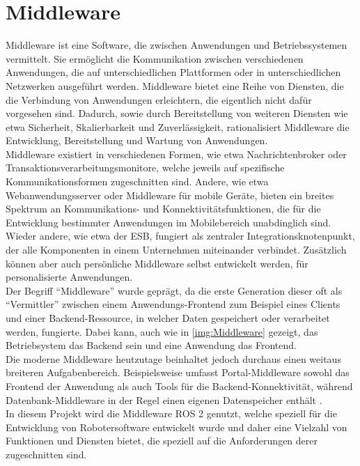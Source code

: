 \section{Middleware}\label{sec:Middleware}
Middleware ist eine Software, die zwischen Anwendungen und Betriebssystemen vermittelt. Sie ermöglicht die Kommunikation zwischen verschiedenen Anwendungen, die auf unterschiedlichen Plattformen oder in unterschiedlichen Netzwerken ausgeführt werden. Middleware bietet eine Reihe von Diensten, die die Verbindung von Anwendungen erleichtern, die eigentlich nicht dafür vorgesehen sind. Dadurch, sowie durch Bereitstellung von weiteren Diensten wie etwa Sicherheit, Skalierbarkeit und Zuverlässigkeit, rationalisiert Middleware die Entwicklung, Bereitstellung und Wartung von Anwendungen.
\\

\noindent
Middleware existiert in verschiedenen Formen, wie etwa Nachrichtenbroker oder Transaktionsverarbeitungsmonitore, welche jeweils auf spezifische Kommunikationsformen zugeschnitten sind. Andere, wie etwa Webanwendungsserver oder Middleware für mobile Geräte, bieten ein breites Spektrum an Kommunikations- und Konnektivitätsfunktionen, die für die Entwicklung bestimmter Anwendungen im Mobilebereich unabdinglich sind. Wieder andere, wie etwa der \ac{ESB}, fungiert als zentraler Integrationsknotenpunkt, der alle Komponenten in einem Unternehmen miteinander verbindet. Zusätzlich können aber auch persönliche Middleware selbst entwickelt werden, für personalisierte Anwendungen.
\\

\noindent
Der Begriff ``Middleware'' wurde geprägt, da die erste Generation dieser oft als ``Vermittler'' zwischen einem Anwendungs-Frontend zum Beispiel eines Clients und einer Backend-Ressource, in welcher Daten gespeichert oder verarbeitet werden, fungierte. Dabei kann, auch wie in \autoref{img:Middleware} gezeigt, das Betriebsystem das Backend sein und eine Anwendung das Frontend.\\
Die moderne Middleware heutzutage beinhaltet jedoch durchaus einen weitaus breiteren Aufgabenbereich. Beispielsweise umfasst Portal-Middleware sowohl das Frontend der Anwendung als auch Tools für die Backend-Konnektivität, während Datenbank-Middleware in der Regel einen eigenen Datenspeicher enthält \cite{AzureMiddleware}.
\\

\noindent
In diesem Projekt wird die Middleware \ac{ROS} 2 genutzt, welche speziell für die Entwicklung von Robotersoftware entwickelt wurde und daher eine Vielzahl von Funktionen und Diensten bietet, die speziell auf die Anforderungen derer zugeschnitten sind.\\

